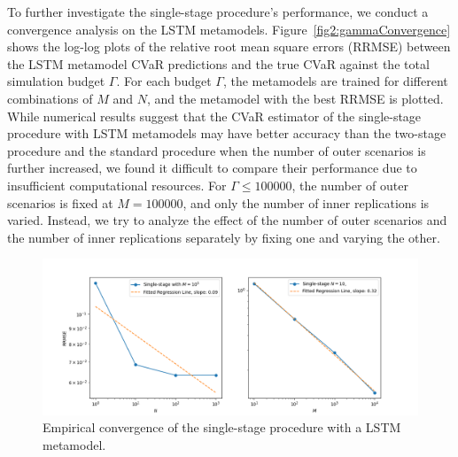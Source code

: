 To further investigate the single-stage procedure's performance, we conduct a convergence analysis on the LSTM metamodels.
Figure~\ref{fig2:gammaConvergence} shows the log-log plots of the relative root mean square errors (RRMSE) between the LSTM metamodel CVaR predictions and the true CVaR against the total simulation budget $\Gamma$.
For each budget $\Gamma$, the metamodels are trained for different combinations of $M$ and $N$, and the metamodel with the best RRMSE is plotted.
While numerical results suggest that the CVaR estimator of the single-stage procedure with LSTM metamodels may have better accuracy than the two-stage procedure and the standard procedure when the number of outer scenarios is further increased, we found it difficult to compare their performance due to insufficient computational resources.
For $\Gamma \leq \num{100000}$, the number of outer scenarios is fixed at $M = \num{100000}$, and only the number of inner replications is varied.
Instead, we try to analyze the effect of the number of outer scenarios and the number of inner replications separately by fixing one and varying the other.

\begin{figure}[ht!]
    \centering
    \includegraphics[width=\textwidth]{./project2/figures/singleStage/MSEConvergence_lstmLoCap_MN.png}
    \caption{Empirical convergence of the single-stage procedure with a LSTM metamodel.} 
    \label{fig2:mnConvergence}
\end{figure}

